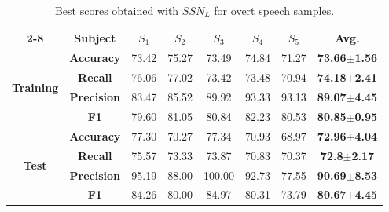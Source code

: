 \begin{table}[h!]
\centering
\caption{Best scores obtained with $SSN_{L}$ for overt speech samples.}
\begin{tabular}{|*{8}{c|}}
	\cline{2-8}
	\multicolumn{1}{c|}{\multirow{1}{*}} & \textbf{Subject} & \boldmath$S_{1}$ & \boldmath$S_{2}$ & \boldmath$S_{3}$ & \boldmath$S_{4}$ & \boldmath$S_{5}$ & \textbf{Avg.} \\\hline
	\multirow{4}{*}{\begin{sideways}\textbf{Training}\end{sideways}} & \textbf{Accuracy} & 73.42 & 75.27 & 73.49 & 74.84 & 71.27 & \textbf{73.66}\boldmath$\pm$\textbf{1.56} \\\cline{2-8}
	& \textbf{Recall} & 76.06 & 77.02 & 73.42 & 73.48 & 70.94 & \textbf{74.18}\boldmath$\pm$\textbf{2.41} \\\cline{2-8}
	& \textbf{Precision} & 83.47 & 85.52 & 89.92 & 93.33 & 93.13 & \textbf{89.07}\boldmath$\pm$\textbf{4.45} \\\cline{2-8}
	& \textbf{F1} & 79.60 & 81.05 & 80.84 & 82.23 & 80.53 & \textbf{80.85}\boldmath$\pm$\textbf{0.95} \\\hline
	\multirow{4}{*}{\begin{sideways}\textbf{Test}\end{sideways}} & \textbf{Accuracy} & 77.30 & 70.27 & 77.34 & 70.93 & 68.97 & \textbf{72.96}\boldmath$\pm$\textbf{4.04} \\\cline{2-8}
	& \textbf{Recall} & 75.57 & 73.33 & 73.87 & 70.83 & 70.37 & \textbf{72.8}\boldmath$\pm$\textbf{2.17} \\\cline{2-8}
	& \textbf{Precision} & 95.19 & 88.00 & 100.00 & 92.73 & 77.55 & \textbf{90.69}\boldmath$\pm$\textbf{8.53} \\\cline{2-8}
	& \textbf{F1} & 84.26 & 80.00 & 84.97 & 80.31 & 73.79 & \textbf{80.67}\boldmath$\pm$\textbf{4.45} \\\hline
\end{tabular}%
\label{Table: Overt_Scores}%
\end{table}%


